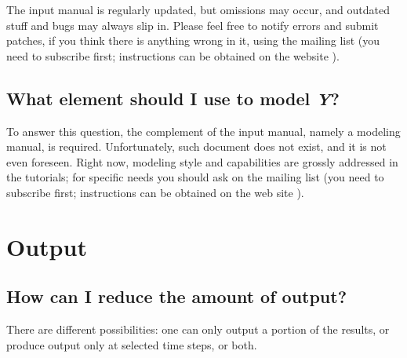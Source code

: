 The input manual is regularly updated, but omissions may occur,
and outdated stuff and bugs may always slip in.
Please feel free to notify errors and submit patches,
if you think there is anything wrong in it, using the
 mailing list
(you need to subscribe first; instructions can be obtained on the website
).

\subsection{What element should I use to model \emph{Y}?}
To answer this question, the complement of the input manual,
namely a modeling manual, is required.
Unfortunately, such document does not exist, and it is not even foreseen.
Right now, modeling style and capabilities are grossly addressed
in the tutorials; for specific needs you should ask on the
mailing list (you need to subscribe first; instructions can be obtained
on the web site
).

\section{Output}
\subsection{How can I reduce the amount of output?}
There are different possibilities: one can only output a portion
of the results, or produce output only at selected time steps, or both.

